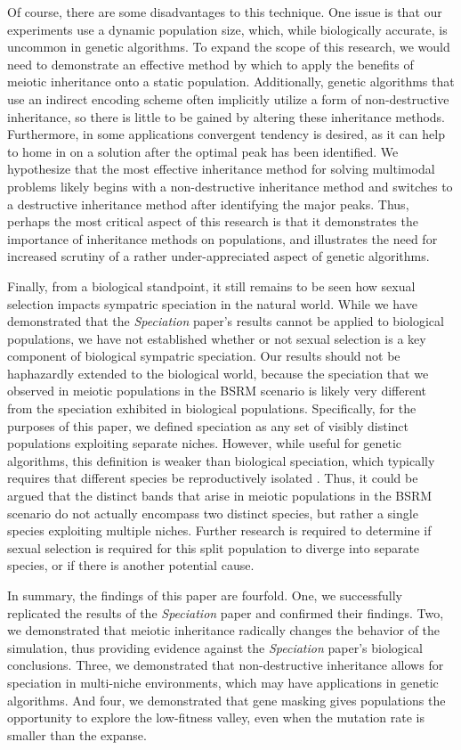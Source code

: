 \documentclass{article}
\begin{document}
Of course, there are some disadvantages to this technique. One issue is that our experiments use a dynamic population size, which, while biologically accurate, is uncommon in genetic algorithms. To expand the scope of this research, we would need to demonstrate an effective method by which to apply the benefits of meiotic inheritance onto a static population. Additionally, genetic algorithms that use an indirect encoding scheme often implicitly utilize a form of non-destructive inheritance, so there is little to be gained by altering these inheritance methods. Furthermore, in some applications convergent tendency is desired, as it can help to home in on a solution after the optimal peak has been identified. We hypothesize that the most effective inheritance method for solving multimodal problems likely begins with a non-destructive inheritance method and switches to a destructive inheritance method after identifying the major peaks. Thus, perhaps the most critical aspect of this research is that it demonstrates the importance of inheritance methods on populations, and illustrates the need for increased scrutiny of a rather under-appreciated aspect of genetic algorithms.

Finally, from a biological standpoint, it still remains to be seen how sexual selection impacts sympatric speciation in the natural world. While we have demonstrated that the \textit{Speciation} paper’s results cannot be applied to biological populations, we have not established whether or not sexual selection is a key component of biological sympatric speciation. Our results should not be haphazardly extended to the biological world, because the speciation that we observed in meiotic populations in the BSRM scenario is likely very different from the speciation exhibited in biological populations. Specifically, for the purposes of this paper, we defined speciation as any set of visibly distinct populations exploiting separate niches. However, while useful for genetic algorithms, this definition is weaker than biological speciation, which typically requires that different species be reproductively isolated \cite{TEXTBOOK}. Thus, it could be argued that the distinct bands that arise in meiotic populations in the BSRM scenario do not actually encompass two distinct species, but rather a single species exploiting multiple niches. Further research is required to determine if sexual selection is required for this split population to diverge into separate species, or if there is another potential cause.

In summary, the findings of this paper are fourfold. One, we successfully replicated the results of the \textit{Speciation} paper and confirmed their findings. Two, we demonstrated that meiotic inheritance radically changes the behavior of the simulation, thus providing evidence against the \textit{Speciation} paper's biological conclusions. Three, we demonstrated that non-destructive inheritance allows for speciation in multi-niche environments, which may have applications in genetic algorithms. And four, we demonstrated that gene masking gives populations the opportunity to explore the low-fitness valley, even when the mutation rate is smaller than the expanse. 

\newpage


\end{document}
